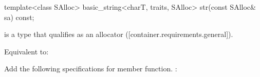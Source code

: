 \documentclass[ebook,11pt,article]{memoir}
\begin{document}
\begin{addedblock}
\begin{itemdecl}
    template<class SAlloc>
    basic_string<charT, traits, SAlloc> str(const SAlloc& sa) const;
\end{itemdecl}

\begin{itemdescr}
\pnum 
\constraints {} is a type that qualifies as an allocator ([container.requirements.general]).

\pnum
\effects Equivalent to: 
\end{itemdescr}
\end{addedblock}

\begin{em}
Add the following specifications for  member function. :
\end{em}
\end{document}
